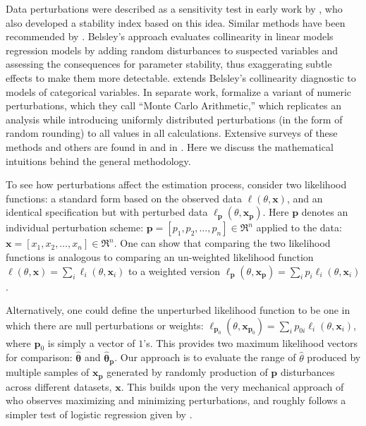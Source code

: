 \documentclass[11pt]{article}
\begin{document}
Data perturbations were described as a sensitivity test in early work by \citet{BeaRubBar76,BeaRubBar77}, who also developed a stability index based on this idea. Similar methods have been 
recommended by  \citet{GilMurWri81,Pregibon81,Cook86,Belsley91}. 
Belsley's approach evaluates collinearity in linear models regression models by adding random                                                               
disturbances to suspected variables and assessing the consequences for parameter stability, thus
exaggerating subtle effects to make them more detectable. 
\citet{HenBelGrot04} extends Belsley's collinearity diagnostic to models of
categorical variables. In separate work, \citet{ParPieEgg00} formalize a variant of 
numeric perturbations, which they call ``Monte Carlo Arithmetic,'' which replicates an analysis while 
introducing uniformly distributed perturbations (in the form of random rounding) to all values in 
all calculations. Extensive surveys of these methods and others are found in \citet{AltGilMcD03} and in \citet{ChaiTrav04a,ChaiTrav04b}.
Here we discuss the mathematical intuitions behind the general methodology. 

To see how perturbations affect the estimation process,
consider two likelihood functions: a standard form based on the observed data $\ell(\theta,\mathbf{x})$, 
and an identical specification but with perturbed data $\ell_\mathbf{p}(\theta,\mathbf{x}_\mathbf{p})$. 
Here $\mathbf{p}$ denotes an individual perturbation scheme: $\mathbf{p}=[p_1,p_2,\ldots,p_n] \in 
\Re^n$ applied to the data: $\mathbf{x}=[x_1,x_2,\ldots,x_n] \in \Re^n$. One
can show that comparing the two likelihood functions is analogous to comparing an un-weighted 
likelihood function $\ell(\theta,\mathbf{x})=\sum_i\ell_i(\theta,\mathbf{x}_i)$ to a weighted 
version $\ell_\mathbf{p}(\theta,\mathbf{x}_\mathbf{p})=\sum_i p_i \ell_i(\theta,\mathbf{x}_i)$. 

Alternatively, one could define the unperturbed likelihood function to be one in which there are null perturbations 
or weights: $\ell_{\mathbf{p}_0}(\theta,\mathbf{x}_{\mathbf{p}_0})=\sum_ip_{0i}\ell_i(\theta,
\mathbf{x}_i)$, where $\mathbf{p}_0$ is simply a vector of $1$'s. This provides two maximum 
likelihood vectors for comparison: $\hat{\mathbf{\theta}}$ and $\hat{\mathbf{\theta}}_\mathbf{p}$. Our 
approach is to evaluate the range of $\hat{\theta}$ 
produced by multiple samples of $\mathbf{x}_\mathbf{p}$ generated by randomly production of 
$\mathbf{p}$ disturbances across different datasets, $\mathbf{x}$. This builds upon the very 
mechanical approach of \citet{Cook86} who observes maximizing and minimizing perturbations, and 
roughly follows a simpler test of logistic regression given by \citet{Pregibon81}.
\end{document}
